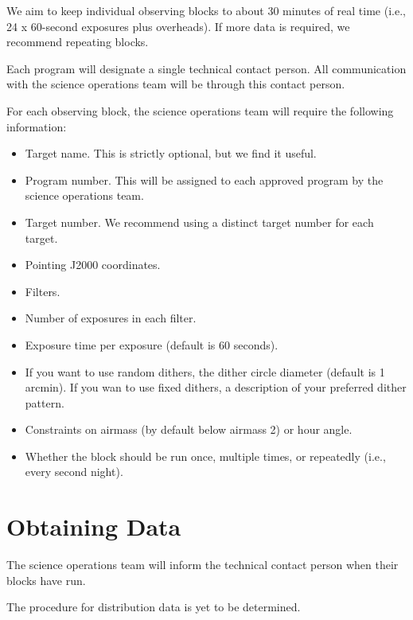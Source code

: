 We aim to keep individual observing blocks to about 30 minutes of real time (i.e., 24 x 60-second exposures plus overheads). If more data is required, we recommend repeating blocks.

Each program will designate a single technical contact person. All communication with the science operations team will be through this contact person.

For each observing block, the science operations team will require the following information:

\begin{itemize}
\item Target name. This is strictly optional, but we find it useful.
\item Program number. This will be assigned to each approved program by the science operations team.
\item Target number. We recommend using a distinct target number for each target.
\item Pointing J2000 coordinates.
\item Filters.
\item Number of exposures in each filter.
\item Exposure time per exposure (default is 60 seconds).
\item If you want to use random dithers, the dither circle diameter (default is 1 arcmin). If you wan to use fixed dithers, a description of your preferred dither pattern.
\item Constraints on airmass (by default below airmass 2) or hour angle.
\item Whether the block should be run once, multiple times, or repeatedly (i.e., every second night).
\end{itemize}

\section{Obtaining Data}

The science operations team will inform the technical contact person when their blocks have run.

The procedure for distribution data is yet to be determined.

